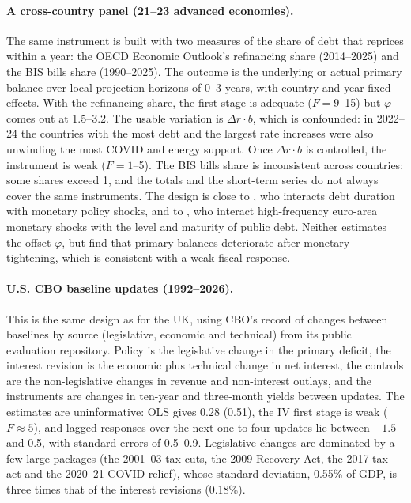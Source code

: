 \paragraph{A cross-country panel (21--23 advanced economies).} The same instrument is built with two measures of the share of debt that reprices within a year: the OECD Economic Outlook's refinancing share (2014--2025) and the BIS bills share (1990--2025). The outcome is the underlying or actual primary balance over local-projection horizons of 0--3 years, with country and year fixed effects. With the refinancing share, the first stage is adequate ($F=9$--15) but $\varphi$ comes out at 1.5--3.2. The usable variation is $\Delta r\cdot b$, which is confounded: in 2022--24 the countries with the most debt and the largest rate increases were also unwinding the most COVID and energy support. Once $\Delta r\cdot b$ is controlled, the instrument is weak ($F=1$--5). The BIS bills share is inconsistent across countries: some shares exceed 1, and the totals and the short-term series do not always cover the same instruments. The design is close to \citet{andreolli2024}, who interacts debt duration with monetary policy shocks, and to \citet{johns2026}, who interact high-frequency euro-area monetary shocks with the level and maturity of public debt. Neither estimates the offset $\varphi$, but \citet{johns2026} find that primary balances deteriorate after monetary tightening, which is consistent with a weak fiscal response.

\paragraph{U.S. CBO baseline updates (1992--2026).} This is the same design as for the UK, using CBO's record of changes between baselines by source (legislative, economic and technical) from its public evaluation repository. Policy is the legislative change in the primary deficit, the interest revision is the economic plus technical change in net interest, the controls are the non-legislative changes in revenue and non-interest outlays, and the instruments are changes in ten-year and three-month yields between updates. The estimates are uninformative: OLS gives 0.28 (0.51), the IV first stage is weak ($F\approx5$), and lagged responses over the next one to four updates lie between $-1.5$ and 0.5, with standard errors of 0.5--0.9. Legislative changes are dominated by a few large packages (the 2001--03 tax cuts, the 2009 Recovery Act, the 2017 tax act and the 2020--21 COVID relief), whose standard deviation, 0.55\% of GDP, is three times that of the interest revisions (0.18\%).
